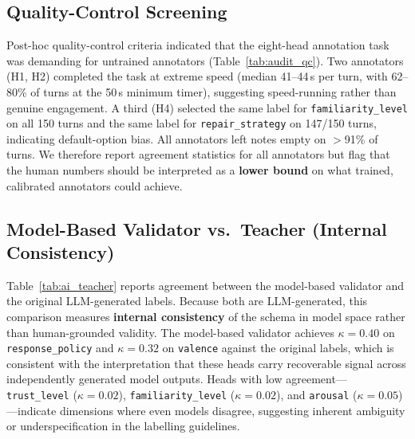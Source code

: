 \documentclass[11pt]{article}
\begin{document}
\subsection{Quality-Control Screening}

Post-hoc quality-control criteria indicated that the eight-head annotation task was demanding for untrained annotators (Table~\ref{tab:audit_qc}).
Two annotators (H1, H2) completed the task at extreme speed (median 41--44\,s per turn, with 62--80\% of turns at the 50\,s minimum timer), suggesting speed-running rather than genuine engagement.
A third (H4) selected the same label for \texttt{familiarity\_level} on all 150 turns and the same label for \texttt{repair\_strategy} on 147/150 turns, indicating default-option bias.
All annotators left notes empty on $>$91\% of turns.
We therefore report agreement statistics for all annotators but flag that the human numbers should be interpreted as a \textbf{lower bound} on what trained, calibrated annotators could achieve.

\begin{table}[tp]
\centering
\caption{Annotator quality-control summary. Min-time ratio = fraction of turns at the 50\,s floor timer. Empty notes = fraction of turns with no free-text note.}
\label{tab:audit_qc}
\scriptsize
{}
\end{table}

\subsection{Model-Based Validator vs.\ Teacher (Internal Consistency)}

Table~\ref{tab:ai_teacher} reports agreement between the model-based validator and the original LLM-generated labels.
Because both are LLM-generated, this comparison measures \textbf{internal consistency} of the schema in model space rather than human-grounded validity.
The model-based validator achieves $\kappa{=}0.40$ on \texttt{response\_policy} and $\kappa{=}0.32$ on \texttt{valence} against the original labels, which is consistent with the interpretation that these heads carry recoverable signal across independently generated model outputs.
Heads with low agreement---\texttt{trust\_level} ($\kappa{=}0.02$), \texttt{familiarity\_level} ($\kappa{=}0.02$), and \texttt{arousal} ($\kappa{=}0.05$)---indicate dimensions where even models disagree, suggesting inherent ambiguity or underspecification in the labelling guidelines.
\end{document}
